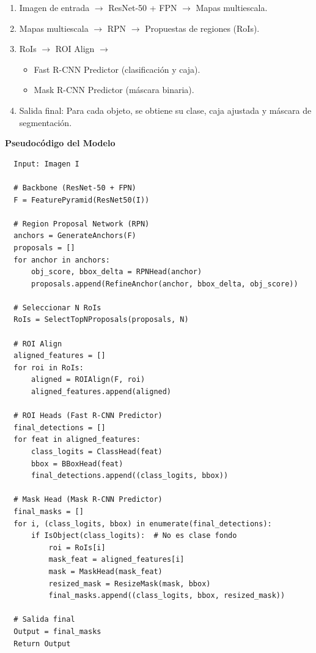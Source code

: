 \begin{enumerate}
\begin{itemize}
\begin{enumerate}
    \item Imagen de entrada $\rightarrow$ ResNet-50 + FPN $\rightarrow$ Mapas multiescala.
    \item Mapas multiescala $\rightarrow$ RPN $\rightarrow$ Propuestas de regiones (RoIs).
    \item RoIs $\rightarrow$ ROI Align $\rightarrow$ 
    \begin{itemize}
        \item Fast R-CNN Predictor (clasificación y caja).
        \item Mask R-CNN Predictor (máscara binaria).
    \end{itemize}
    \item Salida final: Para cada objeto, se obtiene su clase, caja ajustada y máscara de segmentación.
\end{enumerate}

\textbf{Pseudocódigo del Modelo}
\begin{verbatim}
  Input: Imagen I
  
  # Backbone (ResNet-50 + FPN)
  F = FeaturePyramid(ResNet50(I))  
  
  # Region Proposal Network (RPN)
  anchors = GenerateAnchors(F)         
  proposals = []
  for anchor in anchors:
      obj_score, bbox_delta = RPNHead(anchor)  
      proposals.append(RefineAnchor(anchor, bbox_delta, obj_score))
  
  # Seleccionar N RoIs
  RoIs = SelectTopNProposals(proposals, N)
  
  # ROI Align
  aligned_features = []
  for roi in RoIs:
      aligned = ROIAlign(F, roi)
      aligned_features.append(aligned)
  
  # ROI Heads (Fast R-CNN Predictor)
  final_detections = []
  for feat in aligned_features:
      class_logits = ClassHead(feat)
      bbox = BBoxHead(feat)
      final_detections.append((class_logits, bbox))
  
  # Mask Head (Mask R-CNN Predictor)
  final_masks = []
  for i, (class_logits, bbox) in enumerate(final_detections):
      if IsObject(class_logits):  # No es clase fondo
          roi = RoIs[i]
          mask_feat = aligned_features[i]
          mask = MaskHead(mask_feat)
          resized_mask = ResizeMask(mask, bbox)
          final_masks.append((class_logits, bbox, resized_mask))
  
  # Salida final
  Output = final_masks
  Return Output
  \end{verbatim}
  



\end{itemize}
\end{enumerate}
